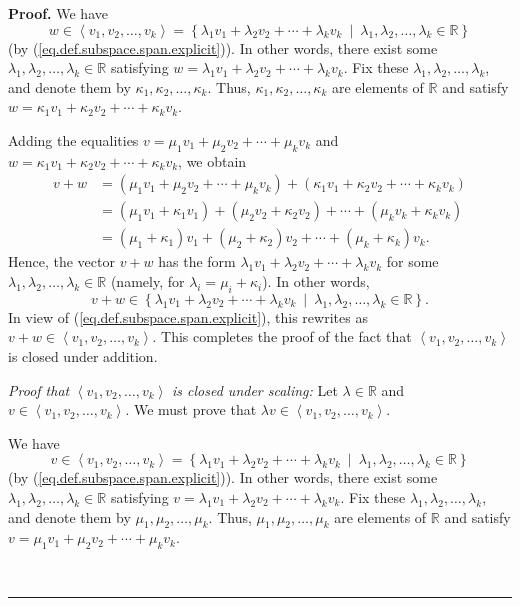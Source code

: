 \documentclass[numbers=enddot,12pt,final,onecolumn,notitlepage]{scrartcl}%
\theoremstyle{definition}
\newenvironment{proof}[1][Proof]{\noindent\textbf{#1.} }{\ \rule{0.5em}{0.5em}}
\begin{document}
\begin{proof}
We have
\[
w\in\left\langle v_{1},v_{2},\ldots,v_{k}\right\rangle =\left\{  \lambda
_{1}v_{1}+\lambda_{2}v_{2}+\cdots+\lambda_{k}v_{k}\ \mid\ \lambda_{1}%
,\lambda_{2},\ldots,\lambda_{k}\in\mathbb{R}\right\}
\]
(by (\ref{eq.def.subspace.span.explicit})). In other words, there exist some
$\lambda_{1},\lambda_{2},\ldots,\lambda_{k}\in\mathbb{R}$ satisfying
$w=\lambda_{1}v_{1}+\lambda_{2}v_{2}+\cdots+\lambda_{k}v_{k}$. Fix these
$\lambda_{1},\lambda_{2},\ldots,\lambda_{k}$, and denote them by $\kappa
_{1},\kappa_{2},\ldots,\kappa_{k}$. Thus, $\kappa_{1},\kappa_{2},\ldots
,\kappa_{k}$ are elements of $\mathbb{R}$ and satisfy $w=\kappa_{1}%
v_{1}+\kappa_{2}v_{2}+\cdots+\kappa_{k}v_{k}$.

Adding the equalities $v=\mu_{1}v_{1}+\mu_{2}v_{2}+\cdots+\mu_{k}v_{k}$ and
$w=\kappa_{1}v_{1}+\kappa_{2}v_{2}+\cdots+\kappa_{k}v_{k}$, we obtain%
\begin{align*}
v+w  &  =\left(  \mu_{1}v_{1}+\mu_{2}v_{2}+\cdots+\mu_{k}v_{k}\right)
+\left(  \kappa_{1}v_{1}+\kappa_{2}v_{2}+\cdots+\kappa_{k}v_{k}\right) \\
&  =\left(  \mu_{1}v_{1}+\kappa_{1}v_{1}\right)  +\left(  \mu_{2}v_{2}%
+\kappa_{2}v_{2}\right)  +\cdots+\left(  \mu_{k}v_{k}+\kappa_{k}v_{k}\right)
\\
&  =\left(  \mu_{1}+\kappa_{1}\right)  v_{1}+\left(  \mu_{2}+\kappa
_{2}\right)  v_{2}+\cdots+\left(  \mu_{k}+\kappa_{k}\right)  v_{k}.
\end{align*}
Hence, the vector $v+w$ has the form $\lambda_{1}v_{1}+\lambda_{2}v_{2}%
+\cdots+\lambda_{k}v_{k}$ for some $\lambda_{1},\lambda_{2},\ldots,\lambda
_{k}\in\mathbb{R}$ (namely, for $\lambda_{i}=\mu_{i}+\kappa_{i}$). In other
words,
\[
v+w\in\left\{  \lambda_{1}v_{1}+\lambda_{2}v_{2}+\cdots+\lambda_{k}v_{k}%
\ \mid\ \lambda_{1},\lambda_{2},\ldots,\lambda_{k}\in\mathbb{R}\right\}  .
\]
In view of (\ref{eq.def.subspace.span.explicit}), this rewrites as
$v+w\in\left\langle v_{1},v_{2},\ldots,v_{k}\right\rangle $. This completes
the proof of the fact that $\left\langle v_{1},v_{2},\ldots,v_{k}\right\rangle
$ is closed under addition.

\textit{Proof that }$\left\langle v_{1},v_{2},\ldots,v_{k}\right\rangle $
\textit{is closed under scaling:} Let $\lambda\in\mathbb{R}$ and
$v\in\left\langle v_{1},v_{2},\ldots,v_{k}\right\rangle $. We must prove that
$\lambda v\in\left\langle v_{1},v_{2},\ldots,v_{k}\right\rangle $.

We have
\[
v\in\left\langle v_{1},v_{2},\ldots,v_{k}\right\rangle =\left\{  \lambda
_{1}v_{1}+\lambda_{2}v_{2}+\cdots+\lambda_{k}v_{k}\ \mid\ \lambda_{1}%
,\lambda_{2},\ldots,\lambda_{k}\in\mathbb{R}\right\}
\]
(by (\ref{eq.def.subspace.span.explicit})). In other words, there exist some
$\lambda_{1},\lambda_{2},\ldots,\lambda_{k}\in\mathbb{R}$ satisfying
$v=\lambda_{1}v_{1}+\lambda_{2}v_{2}+\cdots+\lambda_{k}v_{k}$. Fix these
$\lambda_{1},\lambda_{2},\ldots,\lambda_{k}$, and denote them by $\mu_{1}%
,\mu_{2},\ldots,\mu_{k}$. Thus, $\mu_{1},\mu_{2},\ldots,\mu_{k}$ are elements
of $\mathbb{R}$ and satisfy $v=\mu_{1}v_{1}+\mu_{2}v_{2}+\cdots+\mu_{k}v_{k}$.


\end{proof}
\end{document}
